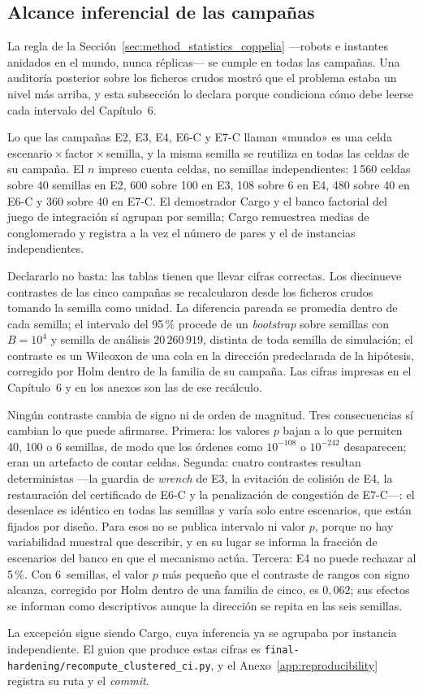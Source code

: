 \subsection{Alcance inferencial de las campañas}
\label{subsec:method-inference-scope}

La regla de la Sección~\ref{sec:method_statistics_coppelia} ---robots e
instantes anidados en el mundo, nunca réplicas--- se cumple en todas las
campañas. Una auditoría posterior sobre los ficheros crudos mostró que el
problema estaba un nivel más arriba, y esta subsección lo declara porque
condiciona cómo debe leerse cada intervalo del Capítulo~6.

Lo que las campañas E2, E3, E4, E6-C y E7-C llaman «mundo» es una celda
escenario\,$\times$\,factor\,$\times$\,semilla, y la misma semilla se reutiliza
en todas las celdas de su campaña. El $n$ impreso cuenta celdas, no semillas
independientes: 1\,560 celdas sobre 40 semillas en E2, 600 sobre 100 en E3, 108
sobre 6 en E4, 480 sobre 40 en E6-C y 360 sobre 40 en E7-C. El demostrador
Cargo y el banco factorial del juego de integración sí agrupan por semilla;
Cargo remuestrea medias de conglomerado y registra a la vez el número de pares
y el de instancias independientes.

Declararlo no basta: las tablas tienen que llevar cifras correctas. Los
diecinueve contrastes de las cinco campañas se recalcularon desde los ficheros
crudos tomando la semilla como unidad. La diferencia pareada se promedia dentro
de cada semilla; el intervalo del 95\,\% procede de un \emph{bootstrap} sobre
semillas con $B=10^4$ y semilla de análisis $20\,260\,919$, distinta de toda
semilla de simulación; el contraste es un Wilcoxon de una cola en la dirección
predeclarada de la hipótesis, corregido por Holm dentro de la familia de su
campaña. Las cifras impresas en el Capítulo~6 y en los anexos son las de ese
recálculo.

Ningún contraste cambia de signo ni de orden de magnitud. Tres consecuencias sí
cambian lo que puede afirmarse. Primera: los valores $p$ bajan a lo que permiten
40, 100 o 6 semillas, de modo que los órdenes como $10^{-108}$ o $10^{-242}$
desaparecen; eran un artefacto de contar celdas. Segunda: cuatro contrastes
resultan deterministas ---la guardia de \emph{wrench} de E3, la evitación de
colisión de E4, la restauración del certificado de E6-C y la penalización de
congestión de E7-C---: el desenlace es idéntico en todas las semillas y varía
solo entre escenarios, que están fijados por diseño. Para esos no se publica
intervalo ni valor $p$, porque no hay variabilidad muestral que describir, y en
su lugar se informa la fracción de escenarios del banco en que el mecanismo
actúa. Tercera: E4 no puede rechazar al 5\,\%. Con 6~semillas, el valor $p$ más
pequeño que el contraste de rangos con signo alcanza, corregido por Holm dentro
de una familia de cinco, es $0{,}062$; sus efectos se informan como descriptivos
aunque la dirección se repita en las seis semillas.

La excepción sigue siendo Cargo, cuya inferencia ya se agrupaba por instancia
independiente. El guion que produce estas cifras es
\texttt{final-hardening/recompute\_clustered\_ci.py}, y el
Anexo~\ref{app:reproducibility} registra su ruta y el \emph{commit}.
